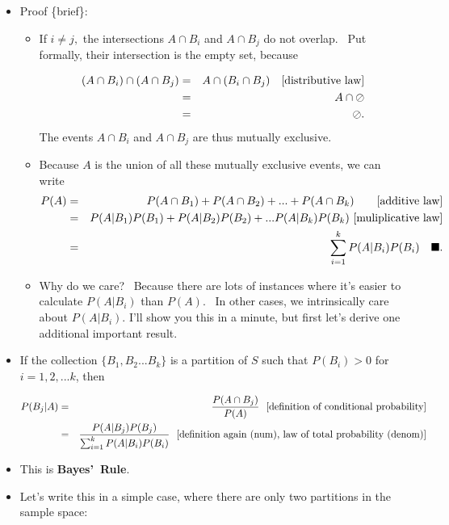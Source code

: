 \documentclass[11pt]{article}
\begin{document}
\begin{itemize}
\begin{itemize}
\begin{itemize}
\item Proof \{brief\}:

\begin{itemize}
\item If $i\neq j,$ the intersections $A\cap B_{i}$ and $A\cap B_{j}$ do not
overlap. \ Put formally, their intersection is the empty set, because

\begin{eqnarray*}
(A\cap B_{i})\cap (A\cap B_{j}) &=&A\cap (B_{i}\cap B_{j})\text{ \ \
[distributive law]} \\
&=&A\cap \oslash \\
&=&\oslash .
\end{eqnarray*}%
The events $A\cap B_{i}$ and $A\cap B_{j}$ are thus mutually exclusive.

\item Because $A$ is the union of all these mutually exclusive events, we
can write 
\begin{eqnarray*}
P(A) &=&P(A\cap B_{1})+P(A\cap B_{2})+...+P(A\cap B_{k})\text{ \ \ \ \ \
[additive law]} \\
&=&P(A|B_{1})P(B_{1})+P(A|B_{2})P(B_{2})+...P(A|B_{k})P(B_{k})\text{
[muliplicative law]} \\
&=&\sum_{i=1}^{k}P(A|B_{i})P(B_{i})\quad \blacksquare .
\end{eqnarray*}

\item Why do we care? \ Because there are lots of instances where it's
easier to calculate $P(A|B_{i})$ than $P(A)$. \ In other cases, we
intrinsically care about $P(A|B_{i})$. I'll show you this in a minute, but
first let's derive one additional important result.
\end{itemize}

\item If the collection $\{B_{1},B_{2}...B_{k}\}$ is a partition of $S$ such
that $P(B_{i})>0$ for $i=1,2,...k$, then

\begin{eqnarray*}
P(B_{j}|A) &=&\frac{P(A\cap B_{j})}{P(A)}\text{ \ [definition of conditional
probability]} \\
&=&\frac{P(A|B_{j})P(B_{j})}{\sum_{i=1}^{k}P(A|B_{i})P(B_{i})}\text{ \
[definition again (num), law of total probability (denom)]}
\end{eqnarray*}

\item This is \textbf{Bayes'\ Rule}.

\item Let's write this in a simple case, where there are only two partitions
in the sample space:


\end{itemize}
\end{itemize}
\end{itemize}
\end{document}
